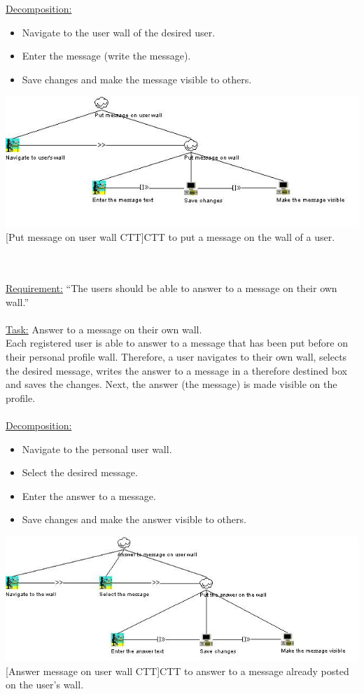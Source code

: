 \documentclass[11pt, a4paper,svglistings,oneside]{book}
\begin{document}
\underline{Decomposition:}
\begin{itemize}
\item Navigate to the user wall of the desired user.
\item Enter the message (write the message).
\item Save changes and make the message visible to others.
\end{itemize}
\noindent\begin{minipage}{\textwidth}
    \centering
   \includegraphics[width=\textwidth]{CTT_Put_Message.png}
 [Put message on user wall CTT]{CTT to put a message on the wall of a user.}
\end{minipage}
$\;$ \\ \\
\underline{Requirement:} ``The users should be able to answer to a message on their own wall.'' \\ \\
\underline{Task:} Answer to a message on their own wall. \\
Each registered user is able to answer to a message that has been put before on their personal profile wall. Therefore, a user navigates to their own wall, selects the desired message, writes the answer to a message in a therefore destined box and saves the changes. Next, the answer (the message) is made visible on the profile.\\ \\
\underline{Decomposition:}
\begin{itemize}
\item Navigate to the personal user wall.
\item Select the desired message.
\item Enter the answer to a message.
\item Save changes and make the answer visible to others.
\end{itemize}
\noindent\begin{minipage}{\textwidth}
    \centering
   \includegraphics[width=\textwidth]{CTT_Answer_Message.png}
 [Answer message on user wall CTT]{CTT to answer to a message already posted on the user's wall.}
\end{minipage}
\end{document}
